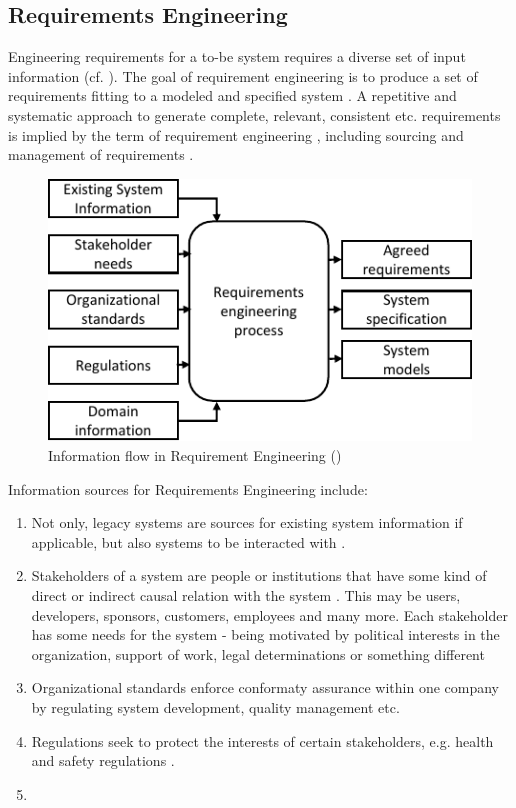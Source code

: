 \subsection{Requirements Engineering}
Engineering requirements for a to-be system requires a diverse set of input information (cf. ). The goal of requirement engineering is to produce a set of requirements fitting to a modeled and specified system \parencite[cf.][28]{Kotonya.2000}. A repetitive and systematic approach to generate complete, relevant, consistent etc. requirements is implied by the term of requirement engineering \parencite[5]{Sommerville.2000}, including sourcing and management of requirements \parencite[262]{Pohl.2007}.
\begin{figure}[H]
    \centering
    \includegraphics[scale=1.3]{img/RequirementInformationStream.pdf}
    \caption[Information flow in Requirements Engineering]{Information flow in Requirement Engineering (\protect\cite[28]{Kotonya.2000})}
    \label{fig:reqFlow}
\end{figure}
Information sources for Requirements Engineering include:
\begin{enumerate}
    \item Not only, legacy systems are sources for existing system information if applicable, but also systems to be interacted with \parencite[cf.][28]{Kotonya.2000}.
    \item Stakeholders of a system are people or institutions that have some kind of direct or indirect causal relation with the system \parencite[cf.][8]{Sommerville.2000}. This may be users, developers, sponsors, customers, employees and many more. Each stakeholder has some needs for the system - being motivated by political interests in the organization, support of work, legal determinations or something different \parencites[cf.][28]{Kotonya.2000}[cf.][350-351]{Lauesen.2008}
    \item Organizational standards enforce conformaty assurance within one company by regulating system development, quality management etc. \parencite[28]{Kotonya.2000}
    \item Regulations seek to protect the interests of certain stakeholders, e.g. health and safety regulations \parencite[cf.][28]{Kotonya.2000}.
    \item {} \parencite[28]{Kotonya.2000} 
\end{enumerate}

